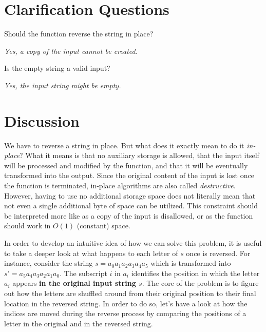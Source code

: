 \section{Clarification Questions}

\begin{QandA}
	\item Should the function reverse the string in place?
	\begin{answered}
		\textit{Yes, a copy of the input cannot be created.}
	\end{answered}

	\item Is the empty string a valid input?
	\begin{answered}
		\textit{Yes, the input string might be empty.}
	\end{answered}
	
\end{QandA}

\section{Discussion}
\label{string_reverse:sec:discussion}
We have to reverse a string in place. But what does it exactly mean to do it
\textit{in-place}? 
What it means is that no auxiliary storage is allowed, that the input itself will be processed and modified by the function, and that it will be eventually transformed into the output.
Since the original content of the input is lost once the function is terminated, in-place algorithms are also called \textit{destructive}.
However, having to use no additional storage space does not literally mean that not even a single additional byte of space can be utilized.
This constraint should be interpreted more like as a copy of the input is disallowed, or as the function should work in $O(1)$ (constant) space.

In order to develop an intuitive idea of how we can solve this problem, it is useful to take a deeper look at what happens to each letter of $s$ once is reversed.
For instance, consider the string $s=a_0 a_1 a_2 a_3 a_4 a_5$ which is transformed into $s'=a_5 a_4 a_3 a_2 a_1 a_0$.
The subscript $i$ in $a_i$ identifies the position in which the letter $a_i$ appears \textbf{in the original input string $s$}. 
The core of the problem is to figure out how the letters are shuffled around from their original position to their final location in the reversed string.
In order to do so, let's have a look at how the indices are moved during the reverse process by comparing the positions of a letter in the original and in the reversed string.

